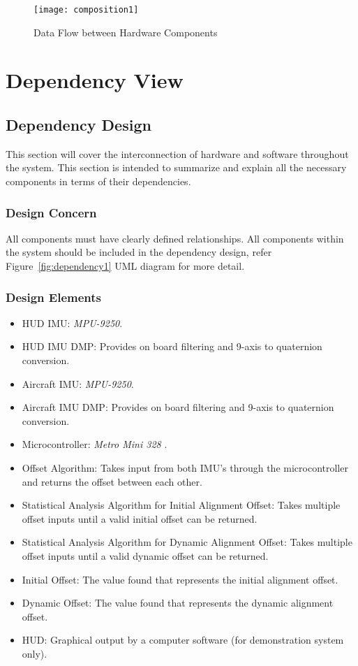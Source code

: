 		\begin{figure}
			\centering
		 		\caption{Data Flow between Hardware Components}
		      	\texttt{[image: composition1]}
		    \label{fig:composition1}
		\end{figure}

\section{Dependency View}
	\subsection{Dependency Design}
	This section will cover the interconnection of hardware and software throughout the system. This section is intended to summarize and explain all the necessary components in terms of their dependencies.\\

		\subsubsection{Design Concern}
		All components must have clearly defined relationships. All components within the system should be included in the dependency design, refer Figure~\ref{fig:dependency1} UML diagram for more detail.\\

		\subsubsection{Design Elements}
		\begin{itemize}
			\item HUD IMU: \textit{MPU-9250}.
			\item HUD IMU DMP: Provides on board filtering and 9-axis to quaternion conversion.
			\item Aircraft IMU: \textit{MPU-9250}.
			\item Aircraft IMU DMP: Provides on board filtering and 9-axis to quaternion conversion.
			\item Microcontroller: \textit{Metro Mini 328} .
			\item Offset Algorithm: Takes input from both IMU’s through the microcontroller and returns the offset between each other.
			\item Statistical Analysis Algorithm for Initial Alignment Offset: Takes multiple offset inputs until a valid initial offset can be returned.
			\item Statistical Analysis Algorithm for Dynamic Alignment Offset: Takes multiple offset inputs until a valid dynamic offset can be returned.
			\item Initial Offset: The value found that represents the initial alignment offset.
			\item Dynamic Offset: The value found that represents the dynamic alignment offset.
			\item HUD: Graphical output by a computer software (for demonstration system only).\\
		\end{itemize}

